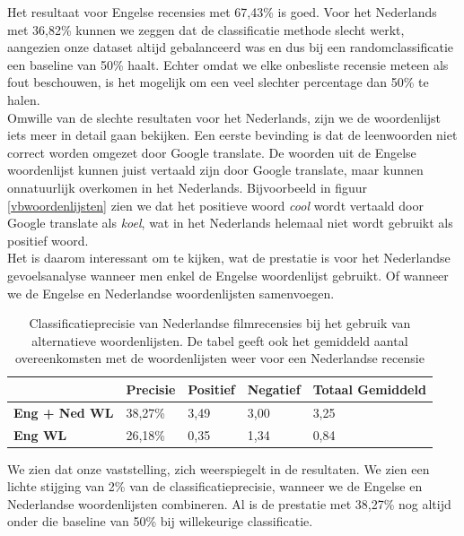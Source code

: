  Het resultaat voor Engelse recensies met 67,43\% is goed. Voor het Nederlands met 36,82\% kunnen we zeggen dat de classificatie methode slecht werkt, aangezien onze dataset altijd gebalanceerd was en dus bij een randomclassificatie een baseline van 50\% haalt. Echter omdat we elke onbesliste recensie meteen als fout beschouwen, is het mogelijk om een veel slechter percentage dan 50\% te halen.\\
 Omwille van de slechte resultaten voor het Nederlands, zijn we de woordenlijst iets meer in detail gaan bekijken. Een eerste bevinding is dat de leenwoorden niet correct worden omgezet door Google translate. De woorden uit de Engelse woordenlijst kunnen juist vertaald zijn door Google translate, maar kunnen onnatuurlijk overkomen in het Nederlands. Bijvoorbeeld in figuur \ref{vbwoordenlijsten} zien we dat het positieve woord \textit{cool} wordt vertaald door Google translate als \textit{koel}, wat in het Nederlands helemaal niet wordt gebruikt als positief woord.\\
 Het is daarom interessant om te kijken, wat de prestatie is voor het Nederlandse gevoelsanalyse wanneer men enkel de Engelse woordenlijst gebruikt. Of wanneer we de Engelse en Nederlandse woordenlijsten samenvoegen.

\begin{table}[H]
\centering
\begin{tabular}{l|l|l|l|l|}
\cline{2-5}
                                         & {\bf Precisie} & {\bf Positief} & {\bf Negatief} & {\bf Totaal Gemiddeld} \\ \hline
\multicolumn{1}{|l|}{{\bf Eng + Ned WL}} & 38,27\%        & 3,49           & 3,00           & 3,25            \\ \hline
\multicolumn{1}{|l|}{{\bf Eng WL}}       & 26,18\%        & 0,35           & 1,34           & 0,84            \\ \hline
\end{tabular}
\caption{Classificatieprecisie van Nederlandse filmrecensies bij het gebruik van alternatieve woordenlijsten. De tabel geeft ook het gemiddeld aantal overeenkomsten met de woordenlijsten weer voor een Nederlandse recensie }
\label{altwoordenlijsten}
\end{table}

We zien dat onze vaststelling, zich weerspiegelt in de resultaten. We zien een lichte stijging van 2\% van de classificatieprecisie, wanneer we de Engelse en Nederlandse woordenlijsten combineren. Al is de prestatie met 38,27\% nog altijd onder die baseline van 50\% bij willekeurige classificatie.


